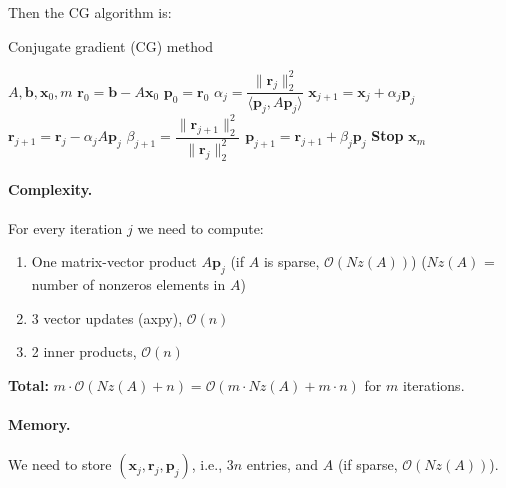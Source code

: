 Then the CG algorithm is:
\begin{algorithm}[H]
    \caption{Conjugate gradient (CG) method}
    \begin{algorithmic}[0]
        \Require $A, \mathbf{b}, \mathbf{x}_0, m$
        \State $\mathbf{r}_0 = \mathbf{b} - A\mathbf{x}_0$
        \State $\mathbf{p}_0 = \mathbf{r}_0$
        \State $\alpha_j = \dfrac{\|\mathbf{r}_j\|_2^2}{\langle \mathbf{p}_j, A \mathbf{p}_j \rangle}$
        \State $\mathbf{x}_{j+1} = \mathbf{x}_j + \alpha_j \mathbf{p}_j$
        \State $\mathbf{r}_{j+1} = \mathbf{r}_j - \alpha_j A \mathbf{p}_j$
        \State $\beta_{j+1} = \dfrac{\|\mathbf{r}_{j+1}\|_2^2}{\|\mathbf{r}_j\|_2^2}$
        \State $\mathbf{p}_{j+1} = \mathbf{r}_{j+1} + \beta_j \mathbf{p}_j$
         \textbf{Stop}
        \EndIf
        \EndFor
        \Return $\mathbf{x}_m$
    \end{algorithmic}
\end{algorithm}

\paragraph{Complexity.}
For every iteration $j$ we need to compute:
\begin{enumerate}
    \item One matrix-vector product $A\mathbf{p}_j$ (if $A$ is sparse, $\mathcal{O}(Nz(A))$) ($Nz(A)$ = number of nonzeros elements in $A$)
    \item 3 vector updates (axpy), $\mathcal{O}(n)$
    \item 2 inner products, $\mathcal{O}(n)$
\end{enumerate}
\textbf{Total:} $m\cdot \mathcal{O}(Nz(A) + n) = \mathcal{O}(m \cdot Nz(A) + m \cdot n)$ for $m$ iterations.
\paragraph{Memory.}
We need to store $(\mathbf{x}_j, \mathbf{r}_j, \mathbf{p}_j)$, i.e., $3n$ entries, and $A$ (if sparse, $\mathcal{O}(Nz(A))$).

